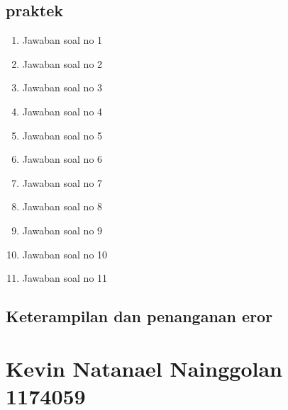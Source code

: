 \subsection{praktek}
\begin{enumerate}
    \item Jawaban soal no 1
    
    \item Jawaban soal no 2
    
    \item Jawaban soal no 3
    
    \item Jawaban soal no 4
    
    \item Jawaban soal no 5
    
    \item Jawaban soal no 6
    
    \item Jawaban soal no 7
    
    \item Jawaban soal no 8
    
    \item Jawaban soal no 9
    
    \item Jawaban soal no 10
    
    \item Jawaban soal no 11
    
\end{enumerate}

\subsection{Keterampilan dan penanganan eror}
    

\section {Kevin Natanael Nainggolan 1174059}
